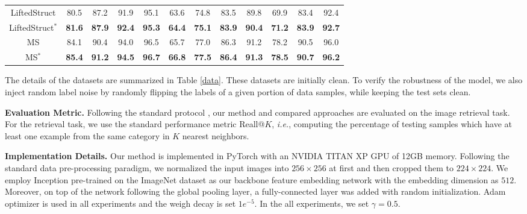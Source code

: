 \documentclass[lettersize,journal]{IEEEtran}
\begin{document}
\begin{table*}[]
{\begin{tabular}{c|cccc|cccc|ccc}
			LiftedStruct \cite{oh2016deep} 	&   80.5   &   87.2   &   91.9   & 95.1 &   63.6   &  74.8    & 83.5     &  89.8    &   69.9   &    83.4      &  92.4  \\
			LiftedStruct$^{*}$ 		&   \textbf{81.6}   &  \textbf{87.9}    &   \textbf{92.4}   &   \textbf{95.3}   &    \textbf{64.4}    &   \textbf{75.1}   &   \textbf{83.9}   &   \textbf{90.4}     &    \textbf{71.2}      &   \textbf{83.9}   &   \textbf{92.7} \\ \hline
			MS \cite{wang2019multi}&  84.1    &   90.4   &   94.0   &   96.5   &   65.7   &   77.0   &    86.3  &  91.2    &  78.2     &   90.5   &   96.0 \\
			MS$^{*}$ &      \textbf{85.4}   &  \textbf{91.2}    &  \textbf{94.5}   &  \textbf{96.7}    &   \textbf{66.8}   &   \textbf{77.5}   &   \textbf{86.4}   &   \textbf{91.3}   &    \textbf{78.5}  &    \textbf{90.7}      &   \textbf{96.2}  \\
		\end{tabular}
	}
	\label{clean}
\end{table*}

The details of the datasets are summarized in Table \ref{data}. These datasets are initially clean. To verify the robustness of the model, we also inject  random label noise by randomly flipping the labels of a given portion of data samples, while keeping the test sets clean.

\textbf{Evaluation Metric.} Following the standard protocol \cite{sohn2016improved,oh2016deep}, our method and compared approaches are evaluated on the image retrieval task. For the retrieval task, we use the standard performance metric Reall@$K$, \textit{i.e.}, computing the percentage of testing samples which have at least one example from the same category in $K$ nearest neighbors.

\textbf{Implementation Details.} Our method is implemented in PyTorch \cite{paszke2019pytorch} with an NVIDIA TITAN XP GPU of 12GB memory. Following  the standard data pre-processing paradigm, we normalized the input images into $256 \times 256$ at first and then cropped them to $224 \times 224$. We employ Inception \cite{ioffe2015batch}
pre-trained on the ImageNet  dataset  \cite{russakovsky2015imagenet} as our backbone feature embedding network with the embedding dimension as $512$. Moreover, on top of the network following
the global pooling layer, a fully-connected layer was added
with random initialization. Adam optimizer \cite{kingma2014adam} is used in all experiments and the weigh decay is set $1e^{-5}$. In the all experiments, we set $\gamma = 0.5$.
\end{document}
